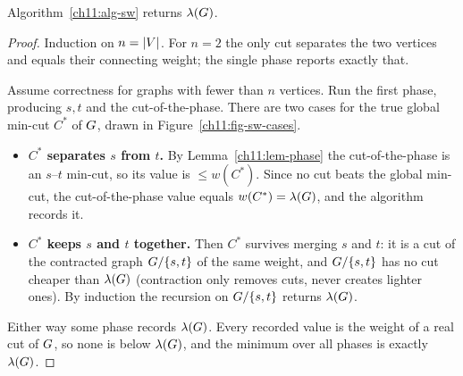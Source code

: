 \begin{theorem}\label{ch11:thm-sw}
Algorithm~\ref{ch11:alg-sw} returns $\lambda(G)$.
\end{theorem}

\begin{proof}
Induction on $n=\lvert V\rvert$. For $n=2$ the only cut separates the two vertices and equals their connecting weight; the single phase reports exactly that.

Assume correctness for graphs with fewer than $n$ vertices. Run the first phase, producing $s,t$ and the cut-of-the-phase. There are two cases for the true global min-cut $C^\ast$ of $G$, drawn in Figure~\ref{ch11:fig-sw-cases}.
\begin{itemize}
  \item \textbf{$C^\ast$ separates $s$ from $t$.} By Lemma~\ref{ch11:lem-phase} the cut-of-the-phase is an $s$--$t$ min-cut, so its value is $\le w(C^\ast)$. Since no cut beats the global min-cut, the cut-of-the-phase value equals $w(C^\ast)=\lambda(G)$, and the algorithm records it.
  \item \textbf{$C^\ast$ keeps $s$ and $t$ together.} Then $C^\ast$ survives merging $s$ and $t$: it is a cut of the contracted graph $G/\{s,t\}$ of the same weight, and $G/\{s,t\}$ has no cut cheaper than $\lambda(G)$ (contraction only removes cuts, never creates lighter ones). By induction the recursion on $G/\{s,t\}$ returns $\lambda(G)$.
\end{itemize}
Either way some phase records $\lambda(G)$. Every recorded value is the weight of a real cut of $G$, so none is below $\lambda(G)$, and the minimum over all phases is exactly $\lambda(G)$.
\end{proof}

